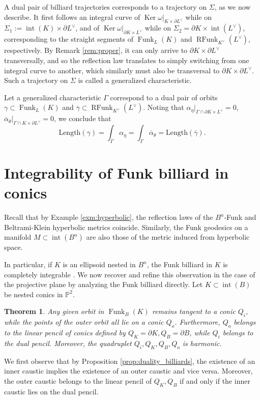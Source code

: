 \documentclass[reqno,10pt]{amsart}
\newcounter{mp}
\newtheorem{Theorem}[Proposition]{Theorem}
\DeclareMathOperator{\inter}{int}
\DeclareMathOperator{\Ker}{Ker}
\DeclareMathOperator{\Funk}{Funk}
\DeclareMathOperator{\RFunk}{RFunk}
\newcommand{\PP}{\mathbb{P}}
\begin{document}
A dual pair of billiard trajectories corresponds to a trajectory on $\Sigma$, as we now describe. It first follows an integral curve of $\Ker \omega|_{K\times \partial L^\vee}$ while on $\Sigma_1:=\inter(K)\times \partial L^\vee$, and of $\Ker\omega|_{\partial K\times L^\vee}$ while on $\Sigma_2 = \partial K\times \inter(L^\vee)$, corresponding to the straight segments of $\Funk_L(K)$ and $\RFunk_{K^\vee}(L^\vee)$, respectively. By Remark \ref{rem:proper}, it can only arrive to $\partial K\times\partial L^\vee$ transversally, and so the reflection law translates to simply switching from one integral curve to another, which similarly must also be transversal to $\partial K\times\partial L^\vee$. Such a trajectory on $\Sigma$ is called a generalized characteristic.

Let a generalized characteristic $\Gamma$ correspond to a dual pair of orbits $\gamma\subset \Funk_L(K)$ and $\overline\gamma\subset\RFunk_{K^\vee}(L^\vee)$. Noting that $\alpha_\eta|_{\Gamma\cap \partial K\times L^\vee}=0$, $\overline \alpha_\theta|_{\Gamma\cap K\times\partial L^\vee}=0$, we conclude that 
\[\textrm{Length}(\gamma)=\int_\Gamma \alpha_\eta=\int_\Gamma \overline\alpha_\theta=\textrm{Length}(\overline\gamma).\]\qedhere


\section{Integrability of Funk billiard in conics}\label{sec:conics}
Recall that by Example \ref{exm:hyperbolic}, the reflection laws of the $B^n$-Funk and Beltrami-Klein hyperbolic metrics coincide. Similarly, the Funk geodesics on a manifold $M\subset \inter(B^n)$ are also those of the metric induced from hyperbolic space. 

In particular, if $K$ is an ellipsoid nested in $B^n$, the Funk billiard in $K$ is completely integrable \cite{veselov, tabachnikov_hyperbolic}.
We now recover and refine this observation in the case of the projective plane by analyzing the Funk billiard directly. Let $K\subset \inter(B)$ be nested conics in $\PP^2$.

\begin{Theorem} Any given orbit in $\Funk_B(K)$ remains tangent to a conic $Q_{i}$, while the points of the outer orbit all lie on a conic $Q_o$.
	Furthermore, $Q_o$ belongs to the linear pencil of conics defined by $Q_K=\partial K,Q_B=\partial B$, while $Q_i$ belongs to the dual pencil. Moreover, the quadruplet $Q_i, Q_K, Q_B, Q_o$ is harmonic.
\end{Theorem}
\proof
We first observe that by Proposition \ref{prop:duality_billiards}, the existence of an inner caustic implies the existence of an outer caustic and vice versa. Moreover, the outer caustic belongs to the linear pencil of $Q_K, Q_B$ if and only if the inner caustic lies on the dual pencil.
\end{document}

